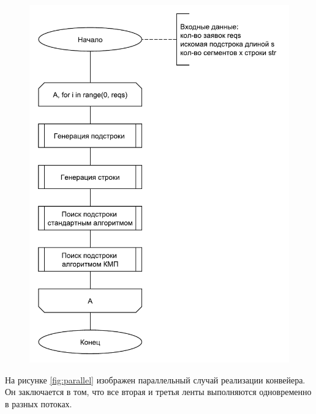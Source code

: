 \begin{figure}
	\centering
	\includegraphics[width=0.7\linewidth]{images/linear}
	\caption[Последовательная обработка лент]{}
	\label{fig:linear}
\end{figure}

На рисунке \ref{fig:parallel} изображен параллельный случай реализации конвейера.
Он заключается в том, что все вторая и третья ленты выполняются одновременно в разных потоках.

